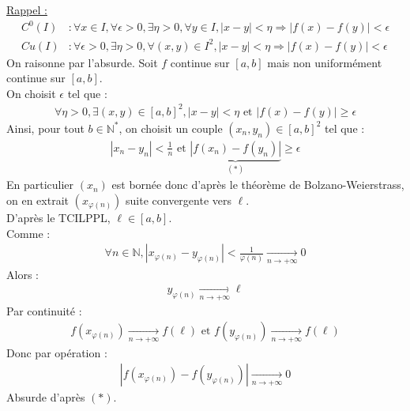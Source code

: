\documentclass[../main.tex]{subfiles}
\begin{document}
\noindent \underline{Rappel :}
\begin{align*}
    C^0(I) &: \forall x \in I, \forall \epsilon > 0, \exists \eta > 0, \forall y \in I, |x-y| < \eta \Rightarrow |f(x) - f(y)| < \epsilon \\
    Cu(I) &: \forall \epsilon > 0, \exists \eta > 0, \forall (x,y) \in I^2, |x-y| < \eta \Rightarrow |f(x) - f(y)| < \epsilon
\end{align*}
On raisonne par l'absurde. Soit $f$ continue sur $[a,b]$ mais non uniformément continue sur $[a,b]$. \\
On choisit $\epsilon$ tel que : 
\begin{align*}
    \forall \eta > 0, \exists (x, y) \in [a,b]^2, |x - y| < \eta \text{ et } |f(x) - f(y)| \geq \epsilon
\end{align*}
Ainsi, pour tout $b \in \mathbb{N}^*$, on choisit un couple $(x_n, y_n) \in [a,b]^2$ tel que : 
\begin{align*}
    |x_n - y_n| < \frac{1}{n} \text{ et } \underbrace{|f(x_n) - f(y_n)|}_{(*)} \geq \epsilon
\end{align*}
En particulier $(x_n)$ est bornée donc d'après le théorème de Bolzano-Weierstrass, on en extrait $(x_{\varphi(n)})$ suite convergente vers $\ell$. \\
D'après le TCILPPL, $\ell \in [a,b]$. \\
Comme : 
\begin{align*}
    \forall n \in \mathbb{N}, |x_{\varphi(n)} - y_{\varphi(n)}| < \frac{1}{\varphi(n)} \underset{n \to +\infty}{\longrightarrow} 0
\end{align*}
Alors : 
\begin{align*}
    y_{\varphi(n)} \underset{n \to +\infty}{\longrightarrow} \ell
\end{align*}
Par continuité : 
\begin{align*}
    f(x_{\varphi(n)}) \underset{n \to +\infty}{\longrightarrow} f(\ell) \text{ et } f(y_{\varphi(n)}) \underset{n \to +\infty}{\longrightarrow} f(\ell)
\end{align*}
Donc par opération : 
\begin{align*}
    |f(x_{\varphi(n)}) - f(y_{\varphi(n)})| \underset{n \to +\infty}{\longrightarrow} 0
\end{align*}
Absurde d'après $(*)$. 
\end{document}
